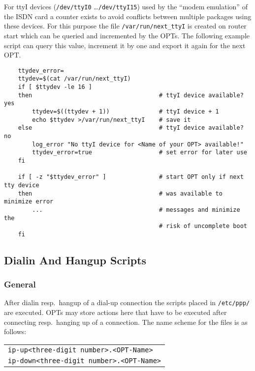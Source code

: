 For ttyI devices (\texttt{/dev/ttyI0} \ldots \texttt{/dev/ttyI15}) used by
the ``modem emulation'' of the ISDN  card a counter exists to avoid conflicts
between multiple packages using these devices.
For this purpose the file \texttt{/var/run/next\_ttyI} is created on router start
which can be queried and incremented by the OPTs. The following example script can
query this value, increment it by one and export it again for the next OPT.

\begin{example}
\begin{verbatim}
    ttydev_error=
    ttydev=$(cat /var/run/next_ttyI)
    if [ $ttydev -le 16 ]
    then                                    # ttyI device available? yes
        ttydev=$((ttydev + 1))              # ttyI device + 1
        echo $ttydev >/var/run/next_ttyI    # save it
    else                                    # ttyI device available? no
        log_error "No ttyI device for <Name of your OPT> available!"
        ttydev_error=true                   # set error for later use
    fi

    if [ -z "$ttydev_error" ]               # start OPT only if next tty device
    then                                    # was available to minimize error
        ...                                 # messages and minimize the
                                            # risk of uncomplete boot
    fi
\end{verbatim}
\end{example}

\subsection{Dialin And Hangup Scripts}

\subsubsection{General}

After dialin resp.\ hangup of a dial-up connection the scripts
placed in \texttt{/etc/ppp/} are executed. OPTs may store actions here
that have to be executed after connecting resp.\ hanging up of a
connection. The name scheme for the files is as follows:

\begin{table}[htbp]
\centering
\begin{tabular}{l}
    \texttt{ip-up<three-digit number>.<OPT-Name>}\\
    \texttt{ip-down<three-digit number>.<OPT-Name>}\\
\end{tabular}
\end{table}

